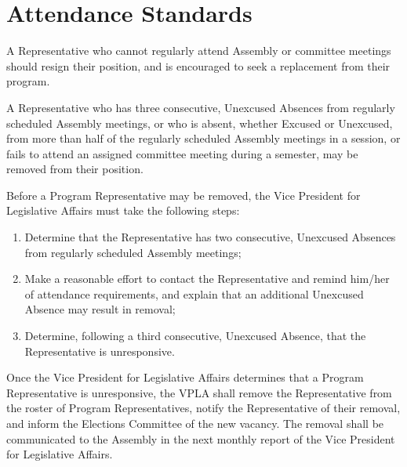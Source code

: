 \section{Attendance Standards}
\begin{bylaws-number}
  \item A Representative who cannot regularly attend Assembly or committee meetings should resign their position, and is encouraged to seek a replacement from their program.
  \item A Representative who has three consecutive, Unexcused Absences from regularly scheduled Assembly meetings, or who is absent, whether Excused or Unexcused, from more than half of the regularly scheduled Assembly meetings in a session, or fails to attend an assigned committee meeting during a semester, may be removed from their position.
  \item Before a Program Representative may be removed, the Vice President for Legislative Affairs must take the following steps:
  \begin{enumerate}
    \item Determine that the Representative has two consecutive, Unexcused Absences from regularly scheduled Assembly meetings;
    \item Make a reasonable effort to contact the Representative and remind him/her of attendance requirements, and explain that an additional Unexcused Absence may result in removal;
    \item Determine, following a third consecutive, Unexcused Absence, that the Representative is unresponsive.
  \end{enumerate}
  \item Once the Vice President for Legislative Affairs determines that a Program Representative is unresponsive, the VPLA shall remove the Representative from the roster of Program Representatives, notify the Representative of their removal, and inform the Elections Committee of the new vacancy. The removal shall be communicated to the Assembly in the next monthly report of the Vice President for Legislative Affairs.
\end{bylaws-number}

